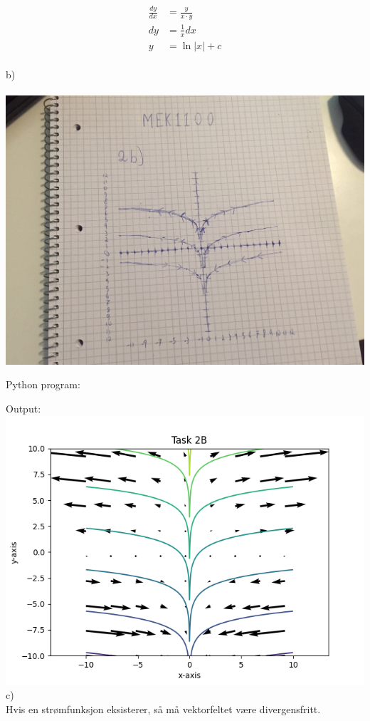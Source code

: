 \documentclass[12pt, a4paper]{article}
\begin{document}
\begin{equation}
    \begin{split}
        \frac{dy}{dx} &= \frac{y}{x \cdot y} \\
                   dy &= \frac{1}{x} dx \\
                    y &= \ln|x| + c
    \end{split}
\end{equation}
\\
b) \\ \\
\hspace*{-1.5cm}
\includegraphics[scale=0.15]{two_b_hand_drawn}


\newpage
Python program:


\newpage
Output: \\
\hspace*{-1.5cm}
\includegraphics{two_b}
\\
c) \\
Hvis en strømfunksjon eksisterer, så må vektorfeltet være divergensfritt.
\end{document}
